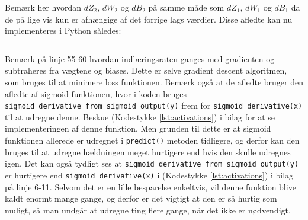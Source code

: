 \documentclass{article}
\newcommand{\listingref}[1]{(Kodestykke \ref{#1})}
\begin{document}
Bemærk her hvordan $dZ_2$, $dW_2$ og $dB_2$ på samme måde som $dZ_1$, $dW_1$ og $dB_1$ da de på lige vis kun er afhængige af det forrige lags værdier. Disse afledte kan nu implementeres i Python således:
\inputminted[firstline=43, lastline=61]{python}{train.py}\noindent
Bemærk på linje 55-60 hvordan indlæringsraten ganges med gradienten og subtraheres fra vægtene og biases. Dette er selve gradient descent algoritmen, som bruges til at minimere loss funktionen. Bemærk også at de afledte bruger den afledte af sigmoid funktionen, hvor i koden bruges \texttt{sigmoid\_derivative\_from\_sigmoid\_output(y)} frem for \texttt{sigmoid\_derivative(x)} til at udregne denne. Beskue \listingref{lst:activations} i bilag for at se implementeringen af denne funktion, Men grunden til dette er at sigmoid funktionen allerede er udregnet i \texttt{predict()} metoden tidligere, og derfor kan den bruges til at udregne hældningen meget hurtigere end hvis den skulle udregnes igen. Det kan også tydligt ses at \texttt{sigmoid\_derivative\_from\_sigmoid\_output(y)} er hurtigere end \texttt{sigmoid\_derivative(x)} i \listingref{lst:activations} i bilag på linje 6-11. Selvom det er en lille besparelse enkeltvis, vil denne funktion blive kaldt enormt mange gange, og derfor er det vigtigt at den er så hurtig som muligt, så man undgår at udregne ting flere gange, når det ikke er nødvendigt. \parencite{smith2024sigmoid}
\end{document}
